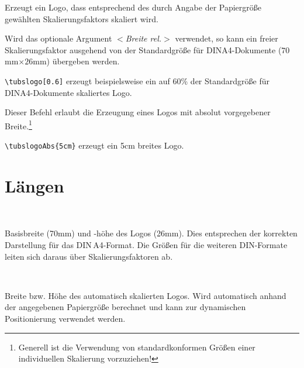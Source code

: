 \begin{Declaration}
\end{Declaration}\label{cmd:tubslogo}

Erzeugt ein Logo, dass entsprechend des durch Angabe der Papiergröße
gewählten Skalierungsfaktors skaliert wird.

Wird das optionale Argument {\sffamily\itshape $<$Breite rel.$>$}
verwendet, so kann ein freier Skalierungsfaktor ausgehend von der
Standardgröße für DINA4-Dokumente ($70$mm$\times 26$mm) übergeben werden.

\lstinline!\tubslogo[0.6]! erzeugt beispielsweise ein auf 60\% der 
Standardgröße für DINA4-Dokumente skaliertes Logo.

\begin{Declaration}
\end{Declaration}\label{cmd:tubslogo}
Dieser Befehl erlaubt die Erzeugung eines Logos mit absolut vorgegebener
Breite.\footnote{Generell ist die Verwendung von standardkonformen Größen
einer individuellen Skalierung vorzuziehen!}

\begin{example}
  \lstinline!\tubslogoAbs{5cm}! erzeugt ein 5cm breites Logo.
\end{example}


\section{Längen}

\begin{Declaration}
  \\
\end{Declaration}
Basisbreite (70mm) und -höhe des Logos (26mm).
Dies entsprechen der korrekten Darstellung für das \mbox{DIN\,A4}-Format.
Die Größen für die weiteren DIN-Formate leiten sich daraus über
Skalierungsfaktoren ab.

\begin{Declaration}
  \\
\end{Declaration}
Breite bzw. Höhe des automatisch skalierten Logos.
Wird automatisch anhand der angegebenen Papiergröße berechnet und
kann zur dynamischen Positionierung verwendet werden.
